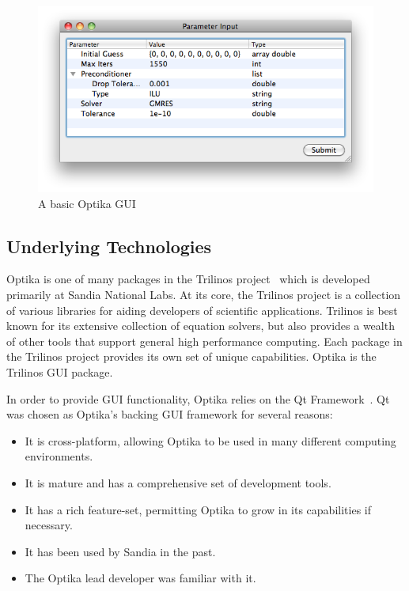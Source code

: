 \begin{figure}
\centering
\includegraphics[scale=0.5]{graphics/basic_example}
\caption[Basic GUI]{A basic Optika GUI}
\label{basicexample}
\end{figure} 

\subsection{Underlying Technologies}
Optika is one of many packages in the Trilinos project~\cite{trilinos} which is developed primarily at Sandia National Labs. At its core, 
the Trilinos project is a collection of various
libraries for aiding developers of scientific applications. Trilinos is best known for its extensive collection of equation solvers,
but also provides a wealth of other tools that support general high performance computing. Each package in the Trilinos project provides
its own set of unique capabilities. Optika is the Trilinos GUI package.

In order to provide GUI functionality, Optika relies on the Qt Framework~\cite{Qt}. 
Qt was chosen as Optika's backing GUI framework for several reasons:
	\begin{itemize}
		\item It is cross-platform, allowing Optika to be used in many different computing environments.
		\item It is mature and has a comprehensive set of development tools. 
		\item It has a rich feature-set, permitting Optika to grow in its capabilities if necessary.
		\item It has been used by Sandia in the past.
		\item The Optika lead developer was familiar with it.
	\end{itemize}

